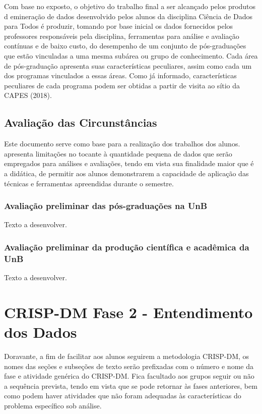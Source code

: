 \documentclass[]{article}
\begin{document}
Com base no exposto, o objetivo do trabalho final a ser alcançado pelos
produtos d emineração de dados desenvolvido pelos alunos da disciplina
Ciência de Dados para Todos é produzir, tomando por base inicial os
dados fornecidos pelos professores responsáveis pela disciplina,
ferramentas para análise e avaliação contínuas e de baixo custo, do
desempenho de um conjunto de pós-graduações que estão vinculadas a uma
mesma subárea ou grupo de conhecimento. Cada área de pós-graduação
apresenta suas características peculiares, assim como cada um dos
programas vinculados a essas áreas. Como já informado, características
peculiares de cada programa podem ser obtidas a partir de visita ao
sítio da CAPES (2018).

\subsection{Avaliação das
Circunstâncias}\label{avaliacao-das-circunstancias}

Este documento serve como base para a realização dos trabalhos dos
alunos. apresenta limitações no tocante à quantidade pequena de dados
que serão empregados para análises e avaliações, tendo em vista sua
finalidade maior que é a didática, de permitir aos alunos demonstrarem a
capacidade de aplicação das técnicas e ferramentas apreendidas durante o
semestre.

\subsubsection{Avaliação preliminar das pós-graduações na
UnB}\label{avaliacao-preliminar-das-pos-graduacoes-na-unb}

Texto a desenvolver.

\subsubsection{Avaliação preliminar da produção científica e acadêmica
da
UnB}\label{avaliacao-preliminar-da-producao-cientifica-e-academica-da-unb}

Texto a desenvolver.

\section{CRISP-DM Fase 2 - Entendimento dos
Dados}\label{crisp-dm-fase-2---entendimento-dos-dados}

Doravante, a fim de facilitar aos alunos seguirem a metodologia
CRISP-DM, os nomes das seções e subseções de texto serão prefixadas com
o número e nome da fase e atividade genérica do CRISP-DM. Fica facultado
aos grupos seguir ou não a sequência prevista, tendo em vista que se
pode retornar às fases anteriores, bem como podem haver atividades que
não foram adequadas às características do problema específico sob
análise.
\end{document}
